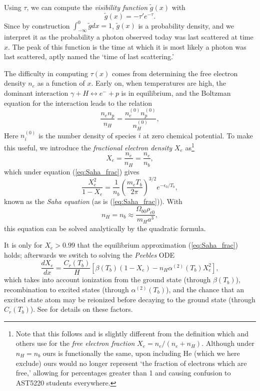 \documentclass[aps,prl,twocolumn,groupedaddress,nofootinbib]{revtex4-2}
\begin{document}
Using $\tau$, we can compute the \textit{visibility function} $\tilde g(x)$ with
\begin{equation}
    \tilde{g}(x) = -\tau' e^{-\tau}.
\end{equation}
Since by construction $\int_{-\infty}^0 \tilde g dx = 1$, $\tilde g(x)$ is a probability density, and we interpret it as the probability a photon observed today was last scattered at time $x$. The peak of this function is the time at which it is most likely a photon was last scattered, aptly named the `time of last scattering.'

The difficulty in computing $\tau(x)$ comes from determining the free electron density $n_e$ as a function of $x$. Early on, when temperatures are high, the dominant interaction $\gamma + H \leftrightarrow e^-+p$ is in equilibrium, and the Boltzman equation for the interaction leads to the relation
\begin{equation}
    \frac{n_en_p}{n_H} = \frac{n_e^{(0)}n_p^{(0)}}{n_H^{(0)}},
    \label{eq:Saha_frac}
\end{equation}
Here $n_i^{(0)}$ is the number density of species $i$ at zero chemical potential. To make this useful, we introduce the \textit{fractional electron density} $X_e$ as\footnote{Note that this follows \citet{callin_how_2006} and is slightly different from the definition which \citet{Dodelson_Schmidt_2026} and others use for the \textit{free electron fraction} $X_e = n_e / (n_e + n_H)$. Although under $n_H=n_b$ ours is functionally the same, upon including He (which we here exclude) ours would no longer represent `the fraction of electrons which are free,' allowing for percentages greater than 1 and causing confusion to AST5220 students everywhere.}
\begin{equation}
    X_e= \frac{n_e}{n_H} = \frac{n_e}{n_b},
    \label{eq:Xe}
\end{equation}
which under equation (\ref{eq:Saha_frac}) gives
\begin{equation}
    \label{eq:Saha}
    \frac{X_e^2}{1-X_e} = \frac{1}{n_b} \left(\frac{m_e
        T_b}{2\pi}\right)^{3/2} e^{-\epsilon_0/T_b},
\end{equation}
known as the \textit{Saha equation} (as is (\ref{eq:Saha_frac})). With
\begin{equation}
    n_H = n_b \approx \frac{\Omega_{b0} \rho_{c0}}{m_H a^3},
    \label{eq:nH approx}
\end{equation}
this equation can be solved analytically by the quadratic formula.

It is only for $X_e > 0.99$ that the equilibrium approximation (\ref{eq:Saha_frac}) holds; afterwards we switch to solving the \textit{Peebles} ODE
\begin{equation}
    \frac{dX_e}{dx} = \frac{C_r(T_b)}{H} \left[\beta(T_b)(1-X_e) - n_H
        \alpha^{(2)}(T_b)X_e^2\right],
    \label{eq:peebles}
\end{equation}
which takes into account ionization from the ground state (through $\beta(T_b)$), recombination to excited states (through $\alpha^{(2)}(T_b)$), and the chance that an excited state atom may be reionized before decaying to the ground state (through $C_r(T_b)$). See \citet{ma_cosmological_1995} for details on these factors.
\end{document}
